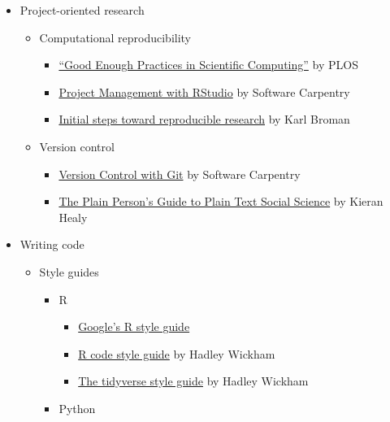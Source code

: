 \documentclass[
]{book}
\providecommand{\tightlist}{%
  \setlength{\itemsep}{0pt}\setlength{\parskip}{0pt}}
\begin{document}
\begin{itemize}
\item
  Project-oriented research

  \begin{itemize}
  \item
    Computational reproducibility

    \begin{itemize}
    \item
      \href{https://github.com/swcarpentry/good-enough-practices-in-scientific-computing/blob/gh-pages/good-enough-practices-for-scientific-computing.pdf}{``Good Enough Practices in Scientific Computing''} by PLOS
    \item
      \href{https://swcarpentry.github.io/r-novice-gapminder/02-project-intro/}{Project Management with RStudio} by Software Carpentry
    \item
      \href{https://kbroman.org/steps2rr/}{Initial steps toward reproducible research} by Karl Broman
    \end{itemize}
  \item
    Version control

    \begin{itemize}
    \item
      \href{https://swcarpentry.github.io/git-novice/}{Version Control with Git} by Software Carpentry
    \item
      \href{http://plain-text.co/}{The Plain Person's Guide to Plain Text Social Science} by Kieran Healy
    \end{itemize}
  \end{itemize}
\item
  Writing code

  \begin{itemize}
  \tightlist
  \item
    Style guides

    \begin{itemize}
    \tightlist
    \item
      R

      \begin{itemize}
      \tightlist
      \item
        \href{https://google.github.io/styleguide/Rguide.xml}{Google's R style guide}
      \item
        \href{http://r-pkgs.had.co.nz/r.html}{R code style guide} by Hadley Wickham
      \item
        \href{http://style.tidyverse.org/}{The tidyverse style guide} by Hadley Wickham
      \end{itemize}
    \item
      Python


\end{itemize}
\end{itemize}
\end{itemize}
\end{document}
